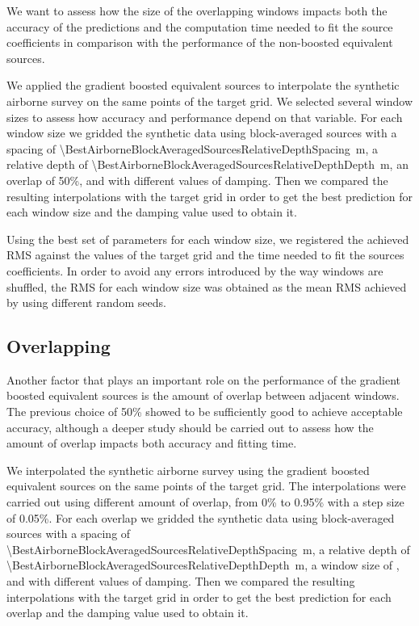 \documentclass[twocolumn]{article}
\begin{document}
We want to assess how the size of the overlapping windows impacts both the
accuracy of the predictions and the computation time needed to fit the source
coefficients in comparison with the performance of the non-boosted equivalent
sources.

We applied the gradient boosted equivalent sources to interpolate the synthetic
airborne survey on the same points of the target grid.
We selected several window sizes to assess how accuracy and performance depend
on that variable.
For each window size we gridded the synthetic data using block-averaged sources
with a spacing of
\SI{\BestAirborneBlockAveragedSourcesRelativeDepthSpacing}{\meter},
a relative depth of
\SI{\BestAirborneBlockAveragedSourcesRelativeDepthDepth}{\meter}, an overlap
of 50\%, and with different values of damping.
Then we compared the resulting interpolations with the target grid in order to
get the best prediction for each window size and the damping value used to
obtain it.

Using the best set of parameters for each window size, we registered the
achieved RMS against the values of the target grid and the time needed to fit
the sources coefficients.
In order to avoid any errors introduced by the way windows are shuffled, the
RMS for each window size was obtained as the mean RMS achieved by using
different random seeds.


\subsection{Overlapping}

Another factor that plays an important role on the performance of the gradient
boosted equivalent sources is the amount of overlap between adjacent windows.
The previous choice of 50\% showed to be sufficiently good to achieve
acceptable accuracy, although a deeper study should be carried out to assess
how the amount of overlap impacts both accuracy and fitting time.

We interpolated the synthetic airborne survey using the gradient boosted
equivalent sources on the same points of the target grid.
The interpolations were carried out using different amount of overlap, from
0\% to 0.95\% with a step size of 0.05\%.
For each overlap we gridded the synthetic data using block-averaged sources
with a spacing of
\SI{\BestAirborneBlockAveragedSourcesRelativeDepthSpacing}{\meter},
a relative depth of
\SI{\BestAirborneBlockAveragedSourcesRelativeDepthDepth}{\meter},
a window size of \BoostOverlappingWindowSize, and with different
values of damping.
Then we compared the resulting interpolations with the target grid in order to
get the best prediction for each overlap and the damping value used to
obtain it.
\end{document}
